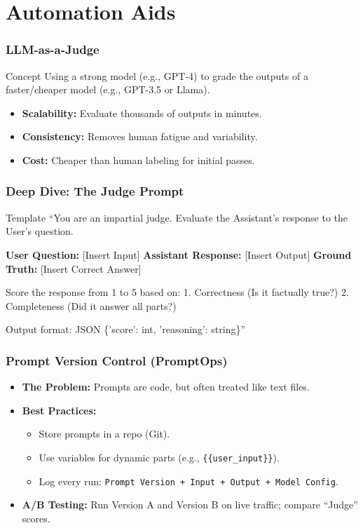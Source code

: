 \documentclass{beamer}
\begin{document}
\section{Automation Aids}

\begin{frame}
    \frametitle{LLM-as-a-Judge}
    \begin{block}{Concept}
        Using a strong model (e.g., GPT-4) to grade the outputs of a faster/cheaper model (e.g., GPT-3.5 or Llama).
    \end{block}
    \begin{itemize}
        \item \textbf{Scalability:} Evaluate thousands of outputs in minutes.
        \item \textbf{Consistency:} Removes human fatigue and variability.
        \item \textbf{Cost:} Cheaper than human labeling for initial passes.
    \end{itemize}
\end{frame}

\begin{frame}[fragile]
    \frametitle{Deep Dive: The Judge Prompt}
    \begin{block}{Template}
        \small
        ``You are an impartial judge. Evaluate the Assistant's response to the User's question.
        
        \textbf{User Question:} [Insert Input]
        \textbf{Assistant Response:} [Insert Output]
        \textbf{Ground Truth:} [Insert Correct Answer]
        
        Score the response from 1 to 5 based on:
        1. Correctness (Is it factually true?)
        2. Completeness (Did it answer all parts?)
        
        Output format: JSON \{'score': int, 'reasoning': string\}''
    \end{block}
\end{frame}

\begin{frame}
    \frametitle{Prompt Version Control (PromptOps)}
    \begin{itemize}
        \item \textbf{The Problem:} Prompts are code, but often treated like text files.
        \item \textbf{Best Practices:}
        \begin{itemize}
            \item Store prompts in a repo (Git).
            \item Use variables for dynamic parts (e.g., \texttt{\{\{user\_input\}\}}).
            \item Log every run: \texttt{Prompt Version + Input + Output + Model Config}.
        \end{itemize}
        \item \textbf{A/B Testing:} Run Version A and Version B on live traffic; compare ``Judge'' scores.
    \end{itemize}
\end{frame}
\end{document}
